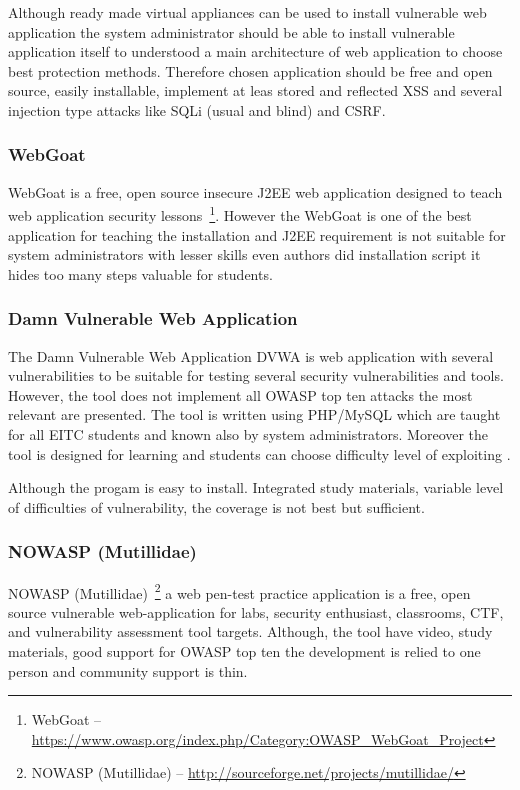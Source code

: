Although ready made virtual appliances can be used to install vulnerable web application the
system administrator should be able to install vulnerable application itself to understood a main architecture of web application to choose best protection methods. Therefore chosen application should be free and open source, easily installable, implement at leas stored and reflected \gls{XSS} and several injection type attacks like \gls{SQLi} (usual and blind) and \gls{CSRF}.

\subsubsection{WebGoat}
WebGoat is a free, open source insecure J2EE web application designed to teach web application security lessons~\footnote{WebGoat -- \url{https://www.owasp.org/index.php/Category:OWASP_WebGoat_Project}}.  However the WebGoat is one of the best application for teaching the installation and J2EE requirement is not suitable for system administrators with lesser skills even authors did installation script it hides too many steps valuable for students. 


\subsubsection{Damn Vulnerable Web Application}
The Damn Vulnerable Web Application \gls{DVWA} is web application with several vulnerabilities to be suitable for testing several security vulnerabilities and tools. However, the tool does not implement all \gls{OWASP} top ten attacks the most relevant are presented. The tool is written using PHP/MySQL which are taught for all \gls{EITC} students and known also by system administrators. Moreover the tool is designed for learning and students can choose difficulty level of exploiting \citep{website:dvwa}.

Although the progam is easy to install. Integrated study materials, variable level of  difficulties of vulnerability, the coverage is not best but sufficient.

\subsubsection{NOWASP (Mutillidae)}
NOWASP (Mutillidae)~\footnote{NOWASP (Mutillidae) -- \url{http://sourceforge.net/projects/mutillidae/}} a web pen-test practice application is a free, open source vulnerable web-application for labs, security enthusiast, classrooms, \gls{CTF}, and vulnerability assessment tool targets. \citep{website:Mutillidae} Although, the tool have video, study materials, good support for \gls{OWASP} top ten the development is relied to one person and community support is thin.
